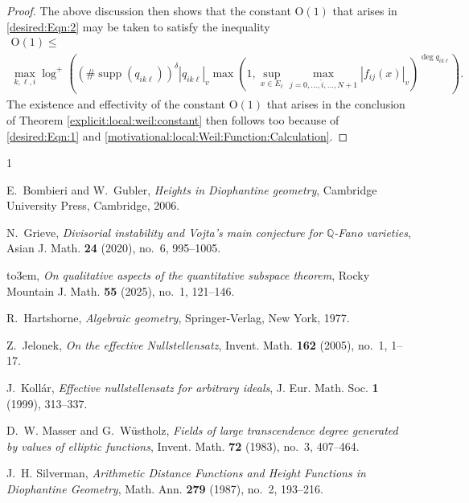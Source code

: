 \documentclass[10pt]{amsart}
\renewcommand{\leq}{\leqslant}
\theoremstyle{definition}
\numberwithin{equation}{section}
\begin{document}
\begin{proof}
The above discussion then shows that the constant $\mathrm{O}(1)$ that arises in \eqref{desired:Eqn:2} may be taken to satisfy the inequality
\begin{multline*}
\mathrm{O}(1) \leq \\
\max_{k,\ell,i} \log^+ \left( \left( \# \operatorname{supp}(q_{ik\ell}) \right)^\delta |q_{ik\ell}|_v \max\left(1,\sup_{x \in E_{\ell}} \max_{j=0,\dots, \hat{i}, \dots,N+1} |f_{ij}(x)|_v\right)^{\deg q_{ik\ell}} \right) \text{.}
\end{multline*}
The existence and effectivity of the constant $\mathrm{O}(1)$ that arises in the conclusion of Theorem \ref{explicit:local:weil:constant} then follows too because of \eqref{desired:Eqn:1} and \eqref{motivational:local:Weil:Function:Calculation}.
\end{proof}


\providecommand{\bysame}{\leavevmode\hbox to3em{\hrulefill}\thinspace}
\providecommand{\MR}{\relax\ifhmode\unskip\space\fi MR }
\providecommand{\MRhref}[2]{%
  \href{http://www.ams.org/mathscinet-getitem?mr=#1}{#2}
}
\providecommand{\href}[2]{#2}
\begin{thebibliography}{1}

E.~Bombieri and W.~Gubler, \emph{Heights in {D}iophantine geometry}, Cambridge
  University Press, Cambridge, 2006.

N.~Grieve, \emph{Divisorial instability and {V}ojta's main conjecture for
  {$\mathbb{Q}$}-{F}ano varieties}, Asian J. Math. \textbf{24} (2020), no.~6,
  995--1005.

\bysame, \emph{On qualitative aspects of the quantitative subspace theorem},
  Rocky Mountain J. Math. \textbf{55} (2025), no.~1, 121--146.

R.~Hartshorne, \emph{Algebraic geometry}, Springer-Verlag, New York, 1977.

Z.~Jelonek, \emph{On the effective {N}ullstellensatz}, Invent. Math.
  \textbf{162} (2005), no.~1, 1--17.

J.~Koll\'{a}r, \emph{Effective nullstellensatz for arbitrary ideals}, J. Eur.
  Math. Soc. \textbf{1} (1999), 313--337.

D.~W. Masser and G.~W\"ustholz, \emph{Fields of large transcendence degree
  generated by values of elliptic functions}, Invent. Math. \textbf{72} (1983),
  no.~3, 407--464.

J.~H. Silverman, \emph{{A}rithmetic {D}istance {F}unctions and {H}eight
  {F}unctions in {D}iophantine {G}eometry}, Math. Ann. \textbf{279} (1987),
  no.~2, 193--216.

\end{thebibliography}
\end{document}
